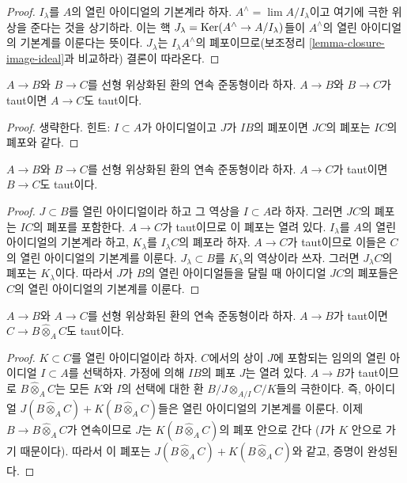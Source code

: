 \begin{proof}
$I_\lambda$를 $A$의 열린 아이디얼의 기본계라 하자.
$A^\wedge = \lim A/I_\lambda$이고 여기에 극한 위상을 준다는 것을
상기하라. 이는 핵
$J_\lambda = \mathop{\mathrm{Ker}}(A^\wedge \to A/I_\lambda)$들이 $A^\wedge$의
열린 아이디얼의 기본계를 이룬다는 뜻이다. $J_\lambda$는
$I_\lambda A^\wedge$의 폐포이므로(보조정리
\ref{lemma-closure-image-ideal}과 비교하라) 결론이 따라온다.
\end{proof}

\begin{lemma}
\label{lemma-composition-taut}
$A \to B$와 $B \to C$를 선형 위상화된 환의 연속 준동형이라 하자.
$A \to B$와 $B \to C$가 taut이면 $A \to C$도 taut이다.
\end{lemma}

\begin{proof}
생략한다. 힌트: $I \subset A$가 아이디얼이고 $J$가 $IB$의
폐포이면 $JC$의 폐포는 $IC$의 폐포와 같다.
\end{proof}

\begin{lemma}
\label{lemma-permanence-taut}
$A \to B$와 $B \to C$를 선형 위상화된 환의 연속 준동형이라 하자.
$A \to C$가 taut이면 $B \to C$도 taut이다.
\end{lemma}

\begin{proof}
$J \subset B$를 열린 아이디얼이라 하고 그 역상을
$I \subset A$라 하자. 그러면 $JC$의 폐포는 $IC$의 폐포를 포함한다.
$A \to C$가 taut이므로 이 폐포는 열려 있다. $I_\lambda$를 $A$의
열린 아이디얼의 기본계라 하고, $K_\lambda$를 $I_\lambda C$의
폐포라 하자. $A \to C$가 taut이므로 이들은 $C$의 열린 아이디얼의
기본계를 이룬다. $J_\lambda \subset B$를 $K_\lambda$의 역상이라
쓰자. 그러면 $J_\lambda C$의 폐포는 $K_\lambda$이다. 따라서
$J$가 $B$의 열린 아이디얼들을 달릴 때 아이디얼 $JC$의 폐포들은
$C$의 열린 아이디얼의 기본계를 이룬다.
\end{proof}

\begin{lemma}
\label{lemma-base-change-taut}
$A \to B$와 $A \to C$를 선형 위상화된 환의 연속 준동형이라 하자.
$A \to B$가 taut이면 $C \to B \widehat{\otimes}_A C$도 taut이다.
\end{lemma}

\begin{proof}
$K \subset C$를 열린 아이디얼이라 하자. $C$에서의 상이
$J$에 포함되는 임의의 열린 아이디얼 $I \subset A$를 선택하자.
가정에 의해 $IB$의 폐포 $J$는 열려 있다. $A \to B$가 taut이므로
$B \widehat{\otimes}_A C$는 모든 $K$와 $I$의 선택에 대한 환
$B/J \otimes_{A/I} C/K$들의 극한이다. 즉, 아이디얼
$J(B \widehat{\otimes}_A C) + K(B \widehat{\otimes}_A C)$들은
열린 아이디얼의 기본계를 이룬다. 이제
$B \to B \widehat{\otimes}_A C$가 연속이므로 $J$는
$K(B \widehat{\otimes}_A C)$의 폐포 안으로 간다
($I$가 $K$ 안으로 가기 때문이다). 따라서 이 폐포는
$J(B \widehat{\otimes}_A C) + K(B \widehat{\otimes}_A C)$와
같고, 증명이 완성된다.
\end{proof}

